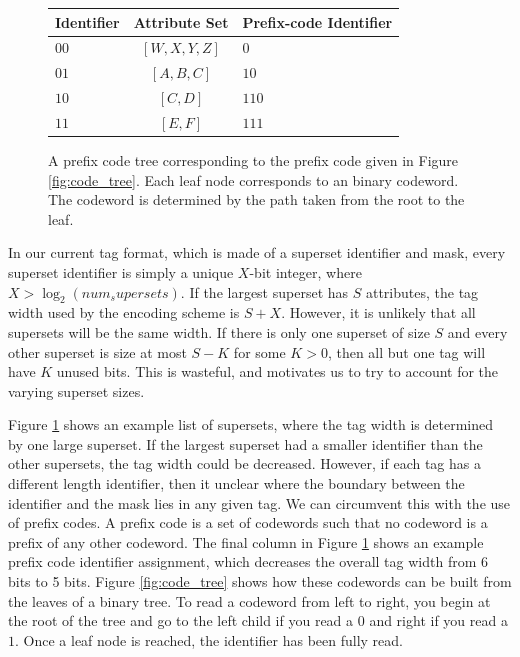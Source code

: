 \begin{figure}[t!] 
\begin{minipage}{1\linewidth}
	\begin{tabular}{| p{1.5cm} | c | p{2cm} |}
    \hline
    Identifier & Attribute Set & Prefix-code Identifier\\ \hline
    $00$ & $[W,X,Y,Z]$ & $0$ \\ \hline
    $01$ & $[A,B,C]$ & $10$ \\ \hline
    $10$ & $[C,D]$ & $110$ \\ \hline
    $11$ & $[E,F]$ & $111$ \\
    \hline
    \end{tabular}
\end{minipage} 
\caption{A prefix code tree corresponding to the prefix code given in Figure \ref{fig:code_tree}. Each leaf node corresponds to an binary codeword. The codeword is determined by the path taken from the root to the leaf. }
\label{fig:variable_ids}
\end{figure}

In our current tag format, which is made of a superset identifier and mask, every superset identifier is simply a unique $X$-bit integer, where $X > \log_2(num_supersets)$. If the largest superset has $S$ attributes, the tag width used by the encoding scheme is $S + X$. However, it is unlikely that all supersets will be the same width. If there is only one superset of size $S$ and every other superset is size at most $S-K$ for some $K > 0$, then all but one tag will have $K$ unused bits. This is wasteful, and motivates us to try to account for the varying superset sizes. 


Figure \ref{fig:variable_ids} shows an example list of supersets, where the tag width is determined by one large superset. If the largest superset had a smaller identifier than the other supersets, the tag width could be decreased. However, if each tag has a different length identifier, then it unclear where the boundary between the identifier and the mask lies in any given tag. We can circumvent this with the use of prefix codes. A prefix code is a set of codewords such that no codeword is a prefix of any other codeword. The final column in Figure \ref{fig:variable_ids} shows an example prefix code identifier assignment, which decreases the overall tag width from 6 bits to 5 bits. Figure \ref{fig:code_tree} shows how these codewords can be built from the leaves of a binary tree. To read a codeword from left to right, you begin at the root of the tree and go to the left child if you read a $0$ and right if you read a $1$. Once a leaf node is reached, the identifier has been fully read.

